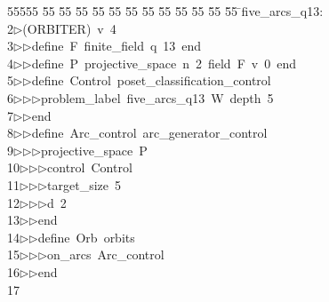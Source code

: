 %
%
\begin{tabbing}
55555 \= 55 \= 55 \= 55 \= 55 \= 55 \= 55 \= 55 \= 55 \= 55 \= 55 \= 55 \= 55 \= \>five\_arcs\_q13:\\[0pt]
2\>$\triangleright$\>(ORBITER)\ v\ 4\ \\[0pt]
3\>$\triangleright$\>$\triangleright$\>define\ F\ finite\_field\ q\ 13\ end\ \\[0pt]
4\>$\triangleright$\>$\triangleright$\>define\ P\ projective\_space\ n\ 2\ field\ F\ v\ 0\ end\ \\[0pt]
5\>$\triangleright$\>$\triangleright$\>define\ Control\ poset\_classification\_control\ \\[0pt]
6\>$\triangleright$\>$\triangleright$\>$\triangleright$\>problem\_label\ five\_arcs\_q13\ W\ depth\ 5\ \\[0pt]
7\>$\triangleright$\>$\triangleright$\>end\ \\[0pt]
8\>$\triangleright$\>$\triangleright$\>define\ Arc\_control\ arc\_generator\_control\ \\[0pt]
9\>$\triangleright$\>$\triangleright$\>$\triangleright$\>projective\_space\ P\ \\[0pt]
10\>$\triangleright$\>$\triangleright$\>$\triangleright$\>control\ Control\ \\[0pt]
11\>$\triangleright$\>$\triangleright$\>$\triangleright$\>target\_size\ 5\ \\[0pt]
12\>$\triangleright$\>$\triangleright$\>$\triangleright$\>d\ 2\ \\[0pt]
13\>$\triangleright$\>$\triangleright$\>end\ \\[0pt]
14\>$\triangleright$\>$\triangleright$\>define\ Orb\ orbits\ \\[0pt]
15\>$\triangleright$\>$\triangleright$\>$\triangleright$\>on\_arcs\ Arc\_control\ \\[0pt]
16\>$\triangleright$\>$\triangleright$\>end\\[0pt]
17\>\end{tabbing}
